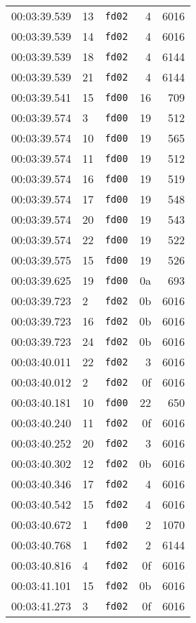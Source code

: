 \documentclass{article}
\begin{document}
\begin{longtable}{lllrr}
00:03:39.539 & 13 & \texttt{fd02} & 4 & 6016 \\
00:03:39.539 & 14 & \texttt{fd02} & 4 & 6016 \\
00:03:39.539 & 18 & \texttt{fd02} & 4 & 6144 \\
00:03:39.539 & 21 & \texttt{fd02} & 4 & 6144 \\
00:03:39.541 & 15 & \texttt{fd00} & 16 & 709 \\
00:03:39.574 & 3 & \texttt{fd00} & 19 & 512 \\
00:03:39.574 & 10 & \texttt{fd00} & 19 & 565 \\
00:03:39.574 & 11 & \texttt{fd00} & 19 & 512 \\
00:03:39.574 & 16 & \texttt{fd00} & 19 & 519 \\
00:03:39.574 & 17 & \texttt{fd00} & 19 & 548 \\
00:03:39.574 & 20 & \texttt{fd00} & 19 & 543 \\
00:03:39.574 & 22 & \texttt{fd00} & 19 & 522 \\
00:03:39.575 & 15 & \texttt{fd00} & 19 & 526 \\
00:03:39.625 & 19 & \texttt{fd00} & 0a & 693 \\
00:03:39.723 & 2 & \texttt{fd02} & 0b & 6016 \\
00:03:39.723 & 16 & \texttt{fd02} & 0b & 6016 \\
00:03:39.723 & 24 & \texttt{fd02} & 0b & 6016 \\
00:03:40.011 & 22 & \texttt{fd02} & 3 & 6016 \\
00:03:40.012 & 2 & \texttt{fd02} & 0f & 6016 \\
00:03:40.181 & 10 & \texttt{fd00} & 22 & 650 \\
00:03:40.240 & 11 & \texttt{fd02} & 0f & 6016 \\
00:03:40.252 & 20 & \texttt{fd02} & 3 & 6016 \\
00:03:40.302 & 12 & \texttt{fd02} & 0b & 6016 \\
00:03:40.346 & 17 & \texttt{fd02} & 4 & 6016 \\
00:03:40.542 & 15 & \texttt{fd02} & 4 & 6016 \\
00:03:40.672 & 1 & \texttt{fd00} & 2 & 1070 \\
00:03:40.768 & 1 & \texttt{fd02} & 2 & 6144 \\
00:03:40.816 & 4 & \texttt{fd02} & 0f & 6016 \\
00:03:41.101 & 15 & \texttt{fd02} & 0b & 6016 \\
00:03:41.273 & 3 & \texttt{fd02} & 0f & 6016 \\

\end{longtable}
\end{document}
